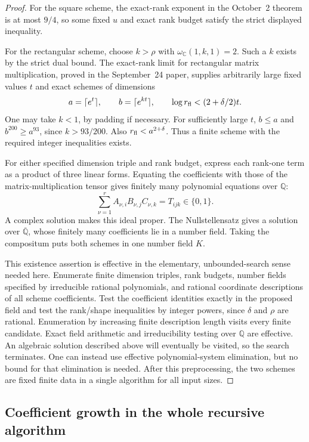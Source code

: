 \begin{proof}
For the square scheme, the exact-rank exponent in the October~2 theorem
is at most $9/4$, so some fixed $u$ and exact rank budget satisfy the
strict displayed inequality.

For the rectangular scheme, choose $k>\rho$ with
$\omega_{\mathbb C}(1,k,1)=2$. Such a $k$ exists by the strict dual bound.
The exact-rank limit for rectangular matrix multiplication, proved in
the September~24 paper, supplies arbitrarily large fixed values $t$ and
exact schemes of dimensions
\[
 a=\lceil e^t\rceil,\qquad b=\lceil e^{kt}\rceil,
 \qquad \log r_{\rm fl}<(2+\delta/2)t.
\]
One may take $k<1$, by padding if necessary. For sufficiently large $t$,
$b\leq a$ and $b^{200}\geq a^{93}$, since $k>93/200$.
Also $r_{\rm fl}<a^{2+\delta}$. Thus a finite scheme with the required
integer inequalities exists.

For either specified dimension triple and rank budget, express each
rank-one term as a product of three linear forms. Equating the
coefficients with those of the matrix-multiplication tensor gives
finitely many polynomial equations over $\mathbb Q$:
\[
 \sum_{\nu=1}^{r} A_{\nu,i}B_{\nu,j}C_{\nu,k}
       =T_{ijk}\in\{0,1\}.
\]
A complex solution makes this ideal proper. The Nullstellensatz gives
a solution over $\overline{\mathbb Q}$, whose finitely many coefficients
lie in a number field. Taking the compositum puts both schemes in one
number field $K$.

This existence assertion is effective in the elementary, unbounded-search
sense needed here. Enumerate finite dimension triples, rank budgets,
number fields specified by irreducible rational polynomials, and rational
coordinate descriptions of all scheme coefficients. Test the coefficient
identities exactly in the proposed field and test the rank/shape
inequalities by integer powers, since $\delta$ and $\rho$ are rational.
Enumeration by increasing finite description length visits every finite
candidate. Exact field arithmetic and irreducibility testing over
$\mathbb Q$ are effective. An algebraic solution described above will
eventually be visited, so the search terminates. One can instead use
effective polynomial-system elimination, but no bound for that elimination
is needed. After this preprocessing, the two schemes are fixed finite
data in a single algorithm for all input sizes.
\end{proof}

\subsection{Coefficient growth in the whole recursive algorithm}

